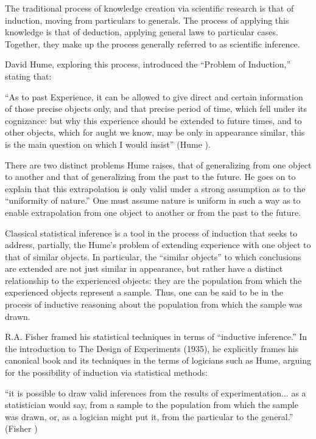\documentclass[a4paper,12pt]{article}
\begin{document}
The traditional process of knowledge creation via scientific research is that of induction, moving from particulars to generals. The process of applying this knowledge is that of deduction, applying general laws to particular cases. Together, they make up the process generally referred to as scientific inference.

David Hume, exploring this process, introduced the ``Problem of Induction,'' stating that:
%
\begin{displayquote}
``As to past Experience, it can be allowed to give direct and certain information of those precise objects only, and that precise period of time, which fell under its cognizance: but why this experience should be extended to future times, and to other objects, which for aught we know, may be only in appearance similar, this is the main question on which I would insist'' (Hume ).  
\end{displayquote}

There are two distinct problems Hume raises, that of generalizing from one object to another and that of generalizing from the past to the future. He goes on to explain that this extrapolation is only valid under a strong assumption as to the ``uniformity of nature.'' One must assume nature is uniform in such a way as to enable extrapolation from one object to another or from the past to the future. 

Classical statistical inference is a tool in the process of induction that seeks to address, partially, the Hume's problem of extending experience with one object to that of similar objects. In particular, the ``similar objects'' to which conclusions are extended are not just similar in appearance, but rather have a distinct relationship to the experienced objects: they are the population from which the experienced objects represent a sample. Thus, one can be said to be in the process of inductive reasoning about the population from which the sample was drawn.

R.A. Fisher framed his statistical techniques in terms of ``inductive inference.'' In the introduction to The Design of Experiments (1935), he explicitly frames his canonical book and its techniques in the terms of logicians such as Hume, arguing for the possibility of induction via statistical methods: 
%
\begin{displayquote}
``it is possible to draw valid inferences from the results of experimentation... as a statistician would say, from a sample to the population from which the sample was drawn, or, as a logician might put it, from the particular to the general.'' (Fisher   )  
\end{displayquote}
\end{document}
